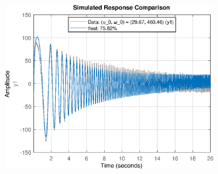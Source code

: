 \begin{figure}[H]
\begin{minipage}{0.32\textwidth}
\begin{figure}[H]
       \end{figure}
    \end{minipage}
    \begin{minipage}{0.32\textwidth}
       \begin{figure}[H]
            \includegraphics[width = \textwidth]{./figs/small_perturbation/time_Compare_1350.eps}
       \end{figure}
    \end{minipage}
\end{figure}
